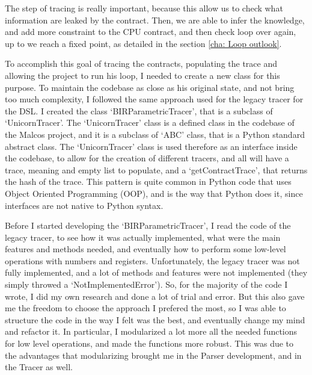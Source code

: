 The step of tracing is really important, because this allow us to check what information
are leaked by the contract. Then, we are able to infer the knowledge, and add
more constraint to the CPU contract, and then check loop over again, up to we
reach a fixed point, as detailed in the section \ref{cha: Loop outlook}.

To accomplish this goal of tracing the contracts, populating the trace and
allowing the project to run his loop, I needed to create a new class for this purpose.
To maintain the codebase as close as his original state, and not bring too much complexity,
I followed the same approach used for the legacy tracer for the DSL. I created the
class `BIRParametricTracer', that is a subclass of `UnicornTracer'. The `UnicornTracer'
class is a defined class in the codebase of the Malcos project, and it is a
subclass of `ABC' class, that is a Python standard abstract class. The `UnicornTracer'
class is used therefore as an interface inside the codebase, to allow for the creation
of different tracers, and all will have a trace, meaning and empty list to populate,
and a `getContractTrace', that returns the hash of the trace. This pattern is
quite common in Python code that uses Object Oriented Programming (OOP), and is the
way that Python does it, since interfaces are not native to Python syntax.

Before I started developing the `BIRParametricTracer', I read the code of the legacy
tracer, to see how it was actually implemented, what were the main features and methods
needed, and eventually how to perform some low-level operations with numbers and
registers. Unfortunately, the legacy tracer was not fully implemented, and a lot
of methods and features were not implemented (they simply throwed a `NotImplementedError').
So, for the majority of the code I wrote, I did my own research and done a lot
of trial and error. But this also gave me the freedom to choose the approach I prefered
the most, so I was able to structure the code in the way I felt was the best, and
eventually change my mind and refactor it. In particular, I modularized a lot more
all the needed functions for low level operations, and made the functions more
robust. This was due to the advantages that modularizing brought me in the Parser
development, and in the Tracer as well.

